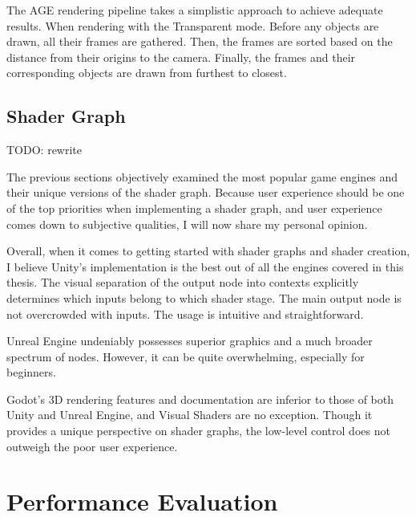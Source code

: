 \documentclass[
  digital,     %
  oneside,     %
  nosansbold,  %
  nocolorbold, %
  lof,         %
  lot,         %
]{fithesis4}
\begin{document}
The AGE rendering pipeline takes a simplistic approach to achieve adequate results.
When rendering with the Transparent mode. Before any objects are drawn,
all their frames are gathered. Then, the frames are sorted based on the distance
from their origins to the camera. Finally, the frames and their corresponding objects are drawn
from furthest to closest.

\section{Shader Graph}
TODO: rewrite

The previous sections objectively examined the most popular game engines and their unique versions of the shader graph.
Because user experience should be one of the top priorities when implementing a shader graph, and user experience
comes down to subjective qualities, I will now share my personal opinion.

Overall, when it comes to getting started with shader graphs and shader creation, I believe Unity's implementation
is the best out of all the engines covered in this thesis. The visual separation of the output node into contexts
explicitly determines which inputs belong to which shader stage. The main output node is not overcrowded with inputs.
The usage is intuitive and straightforward.

Unreal Engine undeniably possesses superior graphics and a much broader spectrum of nodes. However, it can
be quite overwhelming, especially for beginners.

Godot's 3D rendering features and documentation are inferior to those of both Unity and Unreal Engine,
and Visual Shaders are no exception. Though it provides a unique perspective on shader graphs,
the low-level control does not outweigh the poor user experience.

\chapter{Performance Evaluation}

\end{document}
